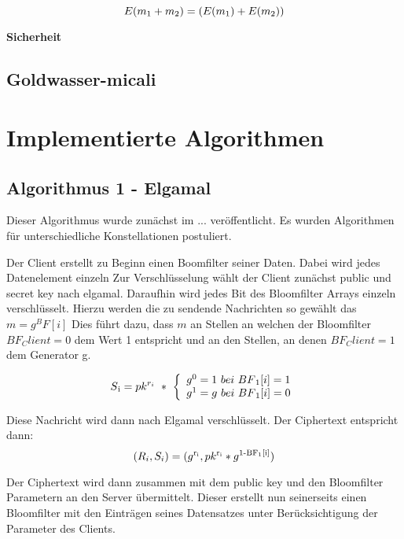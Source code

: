 $$ E(m \textsubscript{1} + m \textsubscript{2}) = (E(m \textsubscript{1}) + E(m \textsubscript{2}))$$

\textbf{Sicherheit}\\
 


\subsection{Goldwasser-micali}
\label{sec:Sec1.3.3}

\section{Implementierte Algorithmen}

\subsection{Algorithmus 1 - Elgamal}

Dieser Algorithmus wurde zunächst im ... veröffentlicht. Es wurden Algorithmen für unterschiedliche Konstellationen postuliert. 

Der Client erstellt zu Beginn einen Boomfilter seiner Daten. Dabei wird jedes Datenelement einzeln 
Zur Verschlüsselung wählt der Client zunächst public und secret key nach elgamal.
Daraufhin wird jedes Bit des Bloomfilter Arrays einzeln verschlüsselt.
Hierzu werden die zu sendende Nachrichten so gewählt das $m = g^BF[i]$
Dies führt dazu, dass $ m $ an Stellen an welchen der Bloomfilter $ BF_Client = 0 $  dem Wert 1  entspricht und an den Stellen, an denen $ BF_Client = 1 $ dem Generator g.

\[
S\textsubscript{i} = pk^{r_{i}} \ * \ \left\{
\begin{array}{ll}
g^{0} = 1 \ bei \  BF\textsubscript{1}[i]=1\\
g^{1} = g \ bei \ BF\textsubscript{1}[i]=0\\
\end{array}
\right.
\]

Diese Nachricht wird dann nach Elgamal verschlüsselt. Der Ciphertext entspricht dann:
$$(R_i, S_i) = (g \textsuperscript{r\textsubscript{i}} , pk\textsuperscript{r\textsubscript{i}} * g\textsuperscript{1-BF\textsubscript{1}[i]})$$

Der Ciphertext wird dann zusammen mit dem public key und den Bloomfilter Parametern an den Server übermittelt.
Dieser erstellt nun seinerseits einen Bloomfilter mit den Einträgen seines Datensatzes unter Berücksichtigung der Parameter des Clients. 

